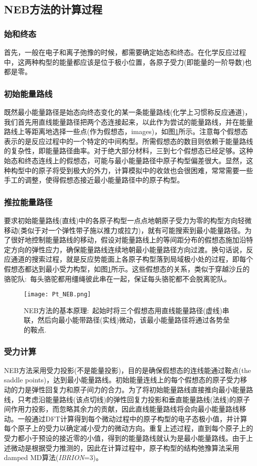 \subsection{NEB方法的计算过程}
\subsubsection{\textrm{始和终态}}
首先，一般在电子和离子弛豫的时候，都需要确定始态和终态。在化学反应过程中，这两种构型的能量都应该是位于极小位置，各原子受力(即能量的一阶导数)也都是零。
\subsubsection{\rm{初始能量路线}}
既然最小能量路径是始态向终态变化的某一条能量路线(化学上习惯称反应通道)，我们首先用直线能量路径把两个态连接起来，以此作为尝试的能量路线，并在能量路线上等距离地选择一些点(作为假想态，\textrm{images})，如图\ref{Pt_NEB}所示。注意每个假想态表示的是反应过程中的一个特定的中间构型。所需假想态的数目则依赖于能量路线的复杂性，即能量路径曲率。对于绝大部分材料，三到七个假想态已经足够。这种始态和终态连线上的假想态，可能与最小能量路径中原子构型偏差很大。显然，这种构型中的原子将受到极大的外力，计算模拟中的收敛也会很困难，常常需要一些手工的调整，使得假想态接近最小能量路径中的原子构型。
\subsubsection{\rm{推拉能量路径}}
要求初始能量路线(直线)中的各原子构型一点点地朝原子受力为零的构型方向轻微移动(类似于对一个弹性带子施以推力或拉力)，就有可能搜索到最小能量路径。为了很好地控制能量路线的移动，假设对能量路线上的等间距分布的假想态施加沿特定方向的弹性应力，确保能量路线连续地朝最小能量路径方向过渡。换句话说，反应通道的搜索过程，就是反应势能面上各原子构型落到局域极小处的过程，即每个假想态都达到最小受力构型，如图\ref{Pt_NEB}所示。这些假想态的关系，类似于穿越沙丘的骆驼队:~每头骆驼都用缰绳彼此串在一起，保证每头骆驼都不会脱离驼队。
\begin{figure}[h!]
\centering
\texttt{[image: Pt\_NEB.png]}
\caption{\small \textrm{NEB}方法的基本原理:~起始时将三个假想态用直线能量路径(虚线)串联，然后向最小能带路径(实线)微动，该最小能量路径将通过各势垒的鞍点.}%
\label{Pt_NEB}
\end{figure}
\subsubsection{\rm{受力计算}}
\textrm{NEB}方法采用受力投影(不是能量投影)，目的是确保假想态的连线能通过鞍点\textrm{(the saddle points)}，达到最小能量路线。初始能量连线上的每个假想态的原子受力移动的力是弹性回复力和原子间力的合力。为了将初始能量路线直接推向最小能量路线，只考虑沿能量路线(该点切线)的弹性回复力投影和垂直能量路线(法线)的原子间作用力投影，而忽略其余力的贡献，因此直线能量路线将会向最小能量路线移动。一般通过\textrm{DFT}计算得到每个微动过程中的原子构型的电子态极小值，并计算每个原子上的受力以确定减小受力的微动方向。重复上述过程，直到每个原子上的受力都小于预设的接近零的小值，得到的能量路线就认为是最小能量路线。由于上述微动是根据受力推测的，因此在计算过程中，原子构型的结构弛豫算法采用\textrm{damped MD}算法(\textit{IBRION}=3)。
